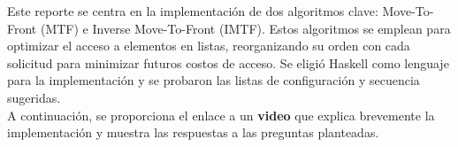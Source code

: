 Este reporte se centra en la implementación de dos algoritmos clave: Move-To-Front (MTF) e Inverse Move-To-Front (IMTF). Estos algoritmos se emplean para optimizar el acceso a elementos en listas, reorganizando su orden con cada solicitud para minimizar futuros costos de acceso. Se eligió Haskell como lenguaje para la implementación y se probaron las listas de configuración y secuencia sugeridas.\\

A continuación, se proporciona el enlace a un \textbf{video} que explica brevemente la implementación y muestra las respuestas a las preguntas planteadas.